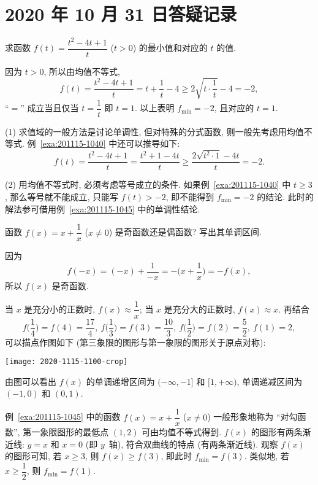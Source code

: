 \section{2020 年 10 月 31 日答疑记录}


\begin{example}\label{exa:201115-1040}
    求函数 $f(t)= \dfrac{t^2-4t+1}t$ ($t>0$) 的最小值和对应的 $t$ 的值.
\end{example}
\begin{solution}
    因为 $t>0$, 所以由均值不等式, 
    \[f(t)= \frac{t^2-4t+1}t= t+\frac1t-4
        \geqslant 2\sqrt{t\cdot\frac1t}-4= -2,\]
    ``$=$'' 成立当且仅当 $t=\dfrac1t$ 即 $t=1$. 以上表明 $f_{\min}=-2$, 且对应的 $t=1$.
\end{solution}
\begin{remark}
    (1) 求值域的一般方法是讨论单调性, 但对特殊的分式函数, 则一般先考虑用均值不等式. 例~\ref{exa:201115-1040} 中还可以推导如下:
    \[f(t)= \frac{t^2-4t+1}t= \frac{t^2+1-4t}t
        \geqslant \frac{2\sqrt{t^2\cdot1}-4t}t= -2.\]
    
    (2) 用均值不等式时, 必须考虑等号成立的条件. 如果例~\ref{exa:201115-1040} 中 $t\geqslant 3$, 那么等号就不能成立, 只能写 $f(t)>-2$, 即不能得到 $f_{\min}=-2$ 的结论. 此时的解法参可借用例~\ref{exa:201115-1045} 中的单调性结论.
\end{remark}

\begin{example}\label{exa:201115-1045}
    函数 $f(x)= x+\dfrac1x$ ($x\neq 0$) 是奇函数还是偶函数? 写出其单调区间.
\end{example}
\begin{solution}
    因为 
    \[f(-x)= (-x)+\frac1{-x}= -\biggl(x+\frac1x\biggr)= -f(x),\]
    所以 $f(x)$ 是奇函数.
    
    当 $x$ 是充分小的正数时, $f(x)\approx \dfrac1x$; 当 $x$ 是充分大的正数时, $f(x)\approx x$. 再结合
    \[f\biggl(\frac14\biggr)= f(4)= \frac{17}4,\ 
      f\biggl(\frac13\biggr)= f(3)= \frac{10}3,\ 
      f\biggl(\frac12\biggr)= f(2)= \frac{5}2,\ 
      f(1)= 2,\]
    可以描点作图如下 (第三象限的图形与第一象限的图形关于原点对称):
    \begin{center}
        \texttt{[image: 2020-1115-1100-crop]}
    \end{center}
    由图可以看出 $f(x)$ 的单调递增区间为 $(-\infty,-1]$ 和 $[1,+\infty)$, 单调递减区间为 $(-1,0)$ 和 $(0,1)$.
\end{solution}

例~\ref{exa:201115-1045} 中的函数 $f(x)= x+\dfrac1x$ ($x\neq 0$) 一般形象地称为 ``对勾函数'', 第一象限图形的最低点 $(1,2)$ 可由均值不等式得到. $f(x)$ 的图形有两条渐近线: $y=x$ 和 $x=0$ (即 $y$~轴), 符合双曲线的特点 (有两条渐近线). 观察 $f(x)$ 的图形可知, 若 $x\geqslant 3$, 则 $f(x)\geqslant f(3)$, 即此时 $f_{\min}=f(3)$. 类似地, 若 $x\geqslant \dfrac12$, 则 $f_{\min}=f(1)$. 

